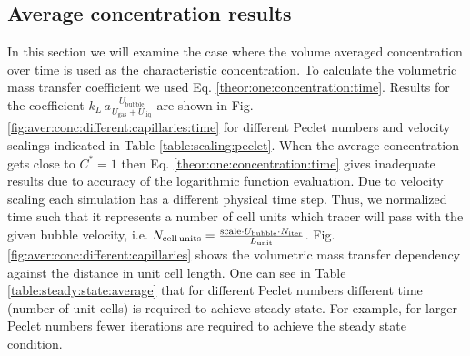 \documentclass{article}
\newcommand{\beqal}{\begin{equation}\begin{aligned}}
\newcommand{\feqal}{\end{aligned}\end{equation}}
\newcommand{\vol}{k_L\,a}
\newcommand{\lunit}{L_{\mathrm{unit}}}
\newcommand{\ububble}{U_{\mathrm{bubble}}}
\newcommand{\uliq}{U_{\mathrm{liq}}}
\newcommand{\ugas}{U_{\mathrm{gas}}}
\newcommand{\cstar}{C^{*}}
\begin{document}
\subsection{Average concentration results}
\label{main:results:periodic}
In this section we will examine the case where the volume averaged concentration over
 time is used as the characteristic concentration. To calculate the volumetric mass transfer coefficient we used Eq. \ref{theor:one:concentration:time}.
Results for the coefficient $\vol \frac{\ububble}{\ugas+\uliq}$ are shown in Fig.
\ref{fig:aver:conc:different:capillaries:time} for different Peclet numbers and velocity scalings
indicated in Table \ref{table:scaling:peclet}. When the average concentration gets
close to $\cstar=1$ then Eq. \ref{theor:one:concentration:time} gives inadequate results due to
 accuracy of the logarithmic function evaluation. 
Due to velocity scaling
each simulation has a different physical time step. Thus, we normalized time such that it represents a number of cell
units which tracer will pass with the given bubble velocity, i.e. 
$N_{\text{cell\,units}}=\frac{\text{scale}\cdot \ububble\cdot N_{\mathrm{iter}}}{\lunit}$.  Fig.
\ref{fig:aver:conc:different:capillaries} shows the volumetric mass transfer
dependency against the distance in unit cell length. One can see in Table
\ref{table:steady:state:average} that for different Peclet numbers different time (number of unit
cells) is required to achieve  steady state. For example, for
larger Peclet numbers fewer iterations are required to achieve the steady state condition. 
\end{document}
